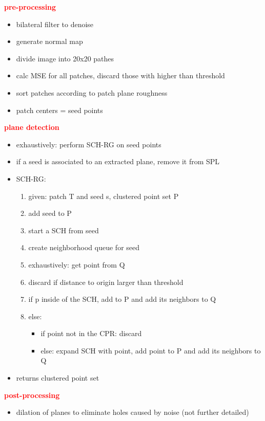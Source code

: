 \documentclass[main.tex]{subfiles}
\begin{document}
\textbf{\textcolor{red}{pre-processing}}
\begin{itemize}
    \item bilateral filter to denoise
    \item generate normal map
    \item divide image into 20x20 pathes
    \item calc MSE for all patches, discard those with higher than threshold
    \item sort patches according to patch plane roughness 
    \item patch centers = seed points
\end{itemize}
\textbf{\textcolor{red}{plane detection}}
\begin{itemize}
    \item exhaustively: perform SCH-RG on seed points 
    \item if a seed is associated to an extracted plane, remove it from SPL
    \item SCH-RG: 
    \begin{enumerate}
        \item given: patch T and seed s, clustered point set P
        \item add seed to P
        \item start a SCH from seed
        \item create neighborhood queue for seed
        \item exhaustively: get point from Q 
        \item discard if distance to origin larger than threshold 
        \item if p inside of the SCH, add to P and add its neighbors to Q
        \item else:
        \begin{itemize}
            \item if point not in the CPR: discard
            \item else: expand SCH with point, add point to P and add its neighbors to Q
        \end{itemize}
    \end{enumerate}
    \item returns clustered point set
\end{itemize}

\textbf{\textcolor{red}{post-processing}}
\begin{itemize}
    \item dilation of planes to eliminate holes caused by noise (not further detailed)
\end{itemize}
\end{document}
